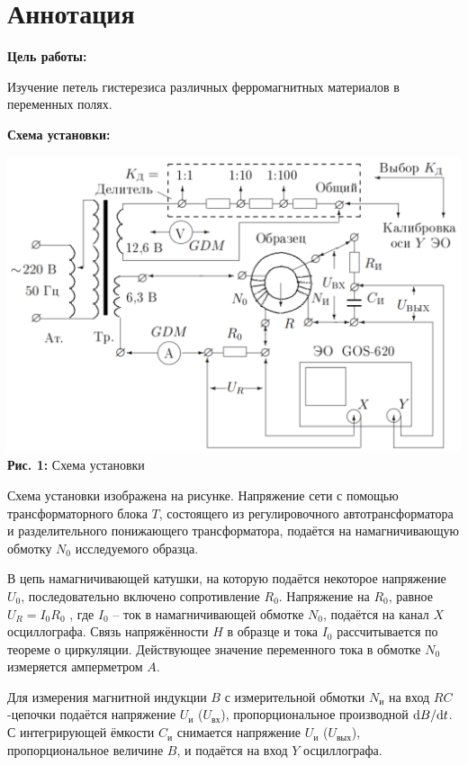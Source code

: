 \documentclass[12pt,a4paper]{scrartcl}
\begin{document}
	\section{Аннотация}
	
	\textbf{Цель работы: }
	
	Изучение петель гистерезиса различных ферромагнитных материалов в переменных полях.
	
	\textbf{Схема установки:}
	\begin{center}
		\includegraphics[scale=0.2]{PIC_1.png}
		\\\textbf{Рис. 1:} Схема установки
	\end{center}	
		
	Схема установки изображена на рисунке. Напряжение сети с помощью трансформаторного блока $T$, состоящего из 	регули­ровочного автотрансформатора и разделительного понижающего трансформатора, подаётся на 						намагничивающую обмотку $N_0$ исследуемого образца.
	
	В цепь намагничивающей катушки, на которую подаётся некоторое напряжение $U_0$, последовательно включено 		сопротивление $R_0$. Напряже­ние на $R_0$, равное $U_R = I_0 R_0$ , где $I_0$ -- ток в намагничивающей 			обмот­ке $N_0$, подаётся на канал $X$ осциллографа. Связь напряжённости $H$ в образце и тока $I_0$ 				рассчитывается по теореме о циркуляции. Действующее значение переменного тока в обмотке $N_0$ измеряется 		амперметром $A$.
	
	Для измерения магнитной индукции $B$ с измерительной обмотки $N_{\text{и}}$ на вход $RC$-цепочки подаётся 		напряжение $U_{\text{и}}$ ($U_{\text{вх}}$), пропорциональное производной $\mathrm{d} B/\mathrm{d} t$. С интегрирующей 		ёмкости $C_{\text{и}}$ снимается напряже­ние $U_{\textbf{и}}$ ($U_{\text{вых}}$), пропорциональное величине 		$B$, и подаётся на вход $Y$ осциллографа.
\end{document}
